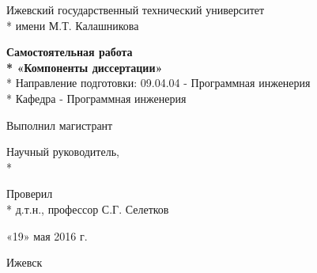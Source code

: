 \begin{titlepage}

\thispagestyle{empty}

\begin{center}
\large
Ижевский государственный технический университет\\*
имени М.Т. Калашникова
\vspace{1cm}
\end{center}

\vspace{8em}

\begin{center}
\large
\textbf{Самостоятельная работа\\*
«Компоненты диссертации»}\\*
Направление подготовки: 09.04.04 - Программная инженерия\\*
Кафедра - Программная инженерия
\end{center}

\vspace{7em}

\begin{flushleft}
Выполнил магистрант \hfill \myname

\vspace{2em}

Научный руководитель,\\*
\myteacherdegree \hfill \myteacher

\vspace{2em}

Проверил\\*
д.т.н., профессор \hfill С.Г. Селетков

\vspace{2em}

\hfill «19» мая 2016 г.
\end{flushleft}

\vspace{\fill}

\begin{center}
    Ижевск \myyear
\end{center}

\end{titlepage}

\setcounter{page}{2}
\pagestyle{plain}

